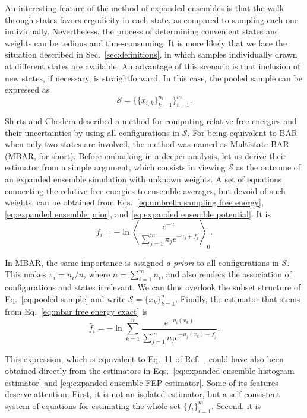 \documentclass[aip,jcp,reprint,amsmath,amssymb]{revtex4-1}
\begin{document}
An interesting feature of the method of expanded ensembles is that the walk through states favors ergodicity in each state, as compared to sampling each one individually. Nevertheless, the process of determining convenient states and weights can be tedious and time-consuming. It is more likely that we face the situation described in Sec.~\ref{sec:definitions}, in which samples individually drawn at different states are available. An advantage of this scenario is that inclusion of new states, if necessary, is straightforward. In this case, the pooled sample can be expressed as
\begin{equation}
\label{eq:pooled sample}
\mathcal S = \Big\{\{x_{i,k}\}_{k=1}^{n_i}\Big\}_{i=1}^m.
\end{equation}

Shirts and Chodera\cite{Shirts_2008} described a method for computing relative free energies and their uncertainties by using all configurations in $\mathcal S$. For being equivalent to BAR when only two states are involved, the method was named as Multistate BAR (MBAR, for short). Before embarking in a deeper analysis, let us derive their estimator from a simple argument, which consists in viewing $\mathcal S$ as the outcome of an expanded ensemble simulation with unknown weights. A set of equations connecting the relative free energies to ensemble averages, but devoid of such weights, can be obtained from Eqs.~\eqref{eq:umbrella sampling free energy}, \eqref{eq:expanded ensemble prior}, and \eqref{eq:expanded ensemble potential}. It is
\begin{equation}
\label{eq:mbar free energy exact}
f_i = -\ln \left\langle \frac{e^{-u_i}}{\sum_{j=1}^m \pi_j e^{-u_j + f_j}} \right\rangle_0.
\end{equation}

In MBAR, the same importance is assigned \textit{a priori} to all configurations in $\mathcal S$. This makes $\pi_i = n_i/n$, where $n = \sum_{i=1}^m n_i$, and also renders the association of configurations and states irrelevant. We can thus overlook the subset structure of Eq.~\eqref{eq:pooled sample} and write $\mathcal S = \{x_k\}_{k=1}^n$. Finally, the estimator that stems from Eq.~\eqref{eq:mbar free energy exact} is
\begin{equation}
\label{eq:mbar free energy estimator}
\hat f_i = -\ln \sum_{k=1}^n \frac{e^{-u_i(x_k)}}{\sum_{j=1}^m n_j e^{-u_j(x_k) + \hat f_j}}.
\end{equation}

This expression, which is equivalent to Eq.~11 of Ref.~, could have also been obtained directly from the estimators in Eqs.~\eqref{eq:expanded ensemble histogram estimator} and \eqref{eq:expanded ensemble FEP estimator}. Some of its features deserve attention. First, it is not an isolated estimator, but a self-consistent system of equations for estimating the whole set $\{f_i\}_{i=1}^m$. Second, it is 
\end{document}
